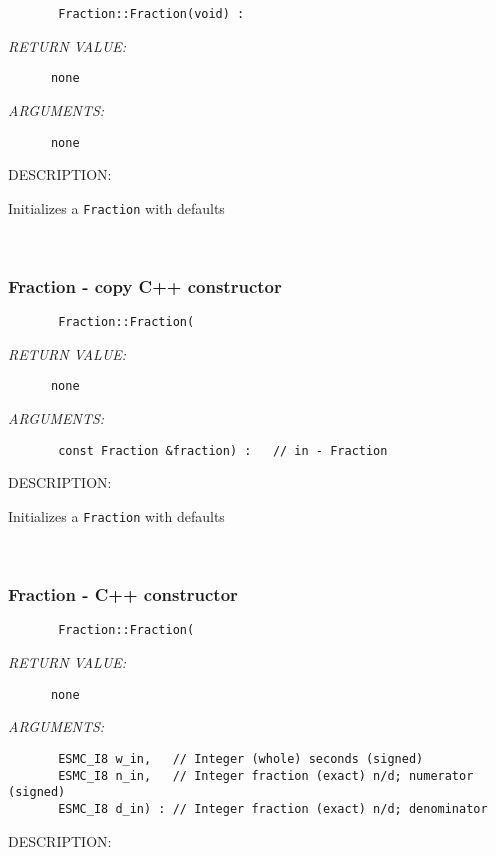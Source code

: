   
\begin{verbatim}       Fraction::Fraction(void) :\end{verbatim}{\em RETURN VALUE:}
\begin{verbatim}      none\end{verbatim}{\em ARGUMENTS:}
\begin{verbatim}      none\end{verbatim}
{\sf DESCRIPTION:\\ }


        Initializes a {\tt Fraction} with defaults
   
 
\mbox{}\hrulefill\ 
 
\subsubsection [Fraction] {Fraction - copy C++ constructor}


  
\begin{verbatim}       Fraction::Fraction(\end{verbatim}{\em RETURN VALUE:}
\begin{verbatim}      none\end{verbatim}{\em ARGUMENTS:}
\begin{verbatim}       const Fraction &fraction) :   // in - Fraction\end{verbatim}
{\sf DESCRIPTION:\\ }


        Initializes a {\tt Fraction} with defaults
   
 
\mbox{}\hrulefill\ 
 
\subsubsection [Fraction] {Fraction - C++ constructor}


  
\begin{verbatim}       Fraction::Fraction(\end{verbatim}{\em RETURN VALUE:}
\begin{verbatim}      none\end{verbatim}{\em ARGUMENTS:}
\begin{verbatim}       ESMC_I8 w_in,   // Integer (whole) seconds (signed)
       ESMC_I8 n_in,   // Integer fraction (exact) n/d; numerator (signed)
       ESMC_I8 d_in) : // Integer fraction (exact) n/d; denominator
 \end{verbatim}
{\sf DESCRIPTION:\\ }



